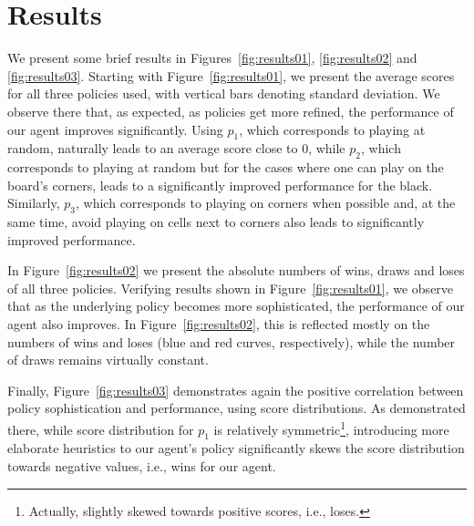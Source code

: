 \documentclass[10pt, twocolumn]{article}
\begin{document}
	\section{Results}
	We present some brief results in Figures~\ref{fig:results01}, \ref{fig:results02} and \ref{fig:results03}. Starting with Figure~\ref{fig:results01}, we present the average scores for all three policies used, with vertical bars denoting standard deviation. We observe there that, as expected, as policies get more refined, the performance of our agent improves significantly. Using $p_1$, which corresponds to playing at random, naturally leads to an average score close to $0$, while $p_2$, which corresponds to playing at random but for the cases where one can play on the board's corners, leads to a significantly improved performance for the black. Similarly, $p_3$, which corresponds to playing on corners when possible and, at the same time, avoid playing on cells next to corners also leads to significantly improved performance.
	
	In Figure~\ref{fig:results02} we present the absolute numbers of wins, draws and loses of all three policies. Verifying results shown in Figure~\ref{fig:results01}, we observe that as the underlying policy becomes more sophisticated, the performance of our agent also improves. In Figure~\ref{fig:results02}, this is reflected mostly on the numbers of wins and loses (blue and red curves, respectively), while the number of draws remains virtually constant.
	
	Finally, Figure~\ref{fig:results03} demonstrates again the positive correlation between policy sophistication and performance, using score distributions. As demonstrated there, while score distribution for $p_1$ is relatively symmetric\footnote{Actually, slightly skewed towards positive scores, i.e., loses.}, introducing more elaborate heuristics to our agent's policy significantly skews the score distribution towards negative values, i.e., wins for our agent.
	
\end{document}
